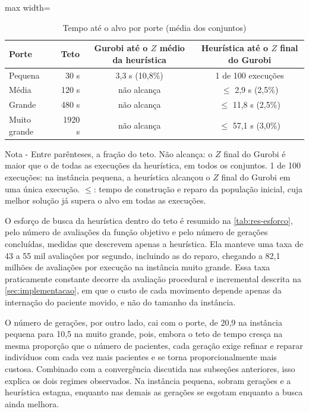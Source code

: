 \begin{table}[H]
    \caption{Tempo até o alvo por porte (média dos conjuntos)}
    \label{tab:res-ttt}
    \centering
    \begin{adjustbox}{max width=\textwidth}
    \begin{tabular}{lrcc}
        \hline
        \textbf{Porte} & \textbf{Teto} & \textbf{Gurobi até o $Z$ médio da heurística} & \textbf{Heurística até o $Z$ final do Gurobi} \\
        \hline
        Pequena      & 30 s   & 3,3 s (10,8\%) & 1 de 100 execuções \\
        Média        & 120 s  & não alcança    & $\leq$ 2,9 s (2,5\%) \\
        Grande       & 480 s  & não alcança    & $\leq$ 11,8 s (2,5\%) \\
        Muito grande & 1920 s & não alcança    & $\leq$ 57,1 s (3,0\%) \\
        \hline
    \end{tabular}
    \end{adjustbox}
    \par\smallskip
    {\footnotesize Nota - Entre parênteses, a fração do teto. Não alcança: o $Z$ final do Gurobi é maior que o de todas as execuções da heurística, em todos os conjuntos. 1 de 100 execuções: na instância pequena, a heurística alcançou o $Z$ final do Gurobi em uma única execução. $\leq$: tempo de construção e reparo da população inicial, cuja melhor solução já supera o alvo em todas as execuções.}
\end{table}

O esforço de busca da heurística dentro do teto é resumido na \autoref{tab:res-esforco}, pelo número de avaliações da função objetivo e pelo número de gerações concluídas, medidas que descrevem apenas a heurística. Ela manteve uma taxa de 43 a 55 mil avaliações por segundo, incluindo as do reparo, chegando a 82,1 milhões de avaliações por execução na instância muito grande. Essa taxa praticamente constante decorre da avaliação procedural e incremental descrita na \autoref{sec:implementacao}, em que o custo de cada movimento depende apenas da internação do paciente movido, e não do tamanho da instância.

O número de gerações, por outro lado, cai com o porte, de 20,9 na instância pequena para 10,5 na muito grande, pois, embora o teto de tempo cresça na mesma proporção que o número de pacientes, cada geração exige refinar e reparar indivíduos com cada vez mais pacientes e se torna proporcionalmente mais custosa. Combinado com a convergência discutida nas subseções anteriores, isso explica os dois regimes observados. Na instância pequena, sobram gerações e a heurística estagna, enquanto nas demais as gerações se esgotam enquanto a busca ainda melhora.

